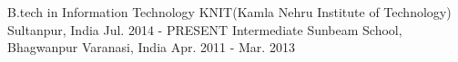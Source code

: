 \begin{cventries}
  \cventry
    {B.tech in Information Technology}
    {KNIT(Kamla Nehru Institute of Technology)}
    {Sultanpur, India}
    {Jul. 2014 - PRESENT}
    {
    }
  \cventry
    {Intermediate}
    {Sunbeam School, Bhagwanpur}
    {Varanasi, India}
    {Apr. 2011 - Mar. 2013}
    {
    }
    
\end{cventries}
